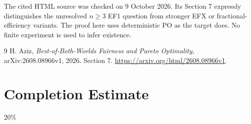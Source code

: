 \documentclass[11pt]{article}
\theoremstyle{definition}
\begin{document}
The cited HTML source was checked on 9 October 2026. Its Section 7 expressly
distinguishes the unresolved $n\ge3$ EF1 question from stronger EFX or
fractional-efficiency variants. The proof here uses deterministic PO as
the target does. No finite experiment is used to infer existence.
\begin{thebibliography}{9}
 H. Aziz, \emph{Best-of-Both-Worlds Fairness and Pareto
Optimality}, arXiv:2608.08966v1, 2026. Section 7.
\url{https://arxiv.org/html/2608.08966v1}.
\end{thebibliography}

\section{Completion Estimate}
20\%
\end{document}
